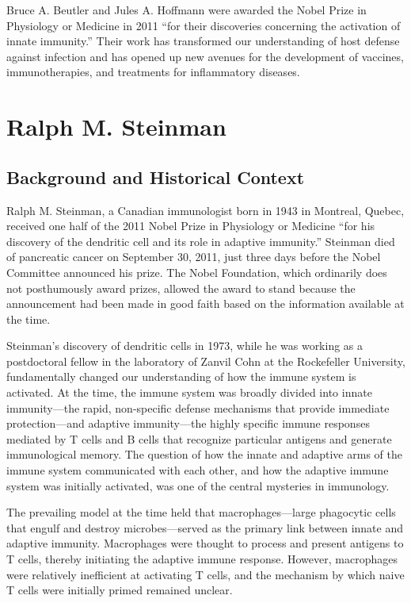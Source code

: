 Bruce A. Beutler and Jules A. Hoffmann were awarded the Nobel Prize in Physiology or Medicine in 2011 ``for their discoveries concerning the activation of innate immunity.'' Their work has transformed our understanding of host defense against infection and has opened up new avenues for the development of vaccines, immunotherapies, and treatments for inflammatory diseases.

\section{Ralph M. Steinman}

\subsection{Background and Historical Context}

Ralph M. Steinman, a Canadian immunologist born in 1943 in Montreal, Quebec, received one half of the 2011 Nobel Prize in Physiology or Medicine ``for his discovery of the dendritic cell and its role in adaptive immunity.'' Steinman died of pancreatic cancer on September 30, 2011, just three days before the Nobel Committee announced his prize. The Nobel Foundation, which ordinarily does not posthumously award prizes, allowed the award to stand because the announcement had been made in good faith based on the information available at the time.

Steinman's discovery of dendritic cells in 1973, while he was working as a postdoctoral fellow in the laboratory of Zanvil Cohn at the Rockefeller University, fundamentally changed our understanding of how the immune system is activated. At the time, the immune system was broadly divided into innate immunity---the rapid, non-specific defense mechanisms that provide immediate protection---and adaptive immunity---the highly specific immune responses mediated by T cells and B cells that recognize particular antigens and generate immunological memory. The question of how the innate and adaptive arms of the immune system communicated with each other, and how the adaptive immune system was initially activated, was one of the central mysteries in immunology.

The prevailing model at the time held that macrophages---large phagocytic cells that engulf and destroy microbes---served as the primary link between innate and adaptive immunity. Macrophages were thought to process and present antigens to T cells, thereby initiating the adaptive immune response. However, macrophages were relatively inefficient at activating T cells, and the mechanism by which naive T cells were initially primed remained unclear.

